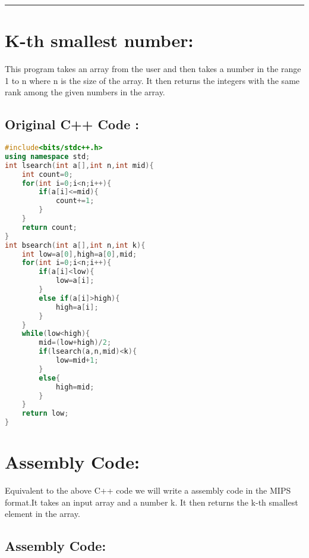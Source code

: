 \documentclass[a4paper,10pt]{article} %
\begin{document}
\rule{\textwidth}{0.5pt}
\section*{\huge{\textbf{K-th smallest number:}}}

This program takes an array from the user and then takes a number in the range 1 to n where n is the size of the array. It then returns the integers with the same rank among the given numbers in the array.

\subsection*{\Large{Original C++ Code :}}


\begin{codebox}
    
\begin{lstlisting}[language=C++]
#include<bits/stdc++.h>
using namespace std;
int lsearch(int a[],int n,int mid){
	int count=0;
	for(int i=0;i<n;i++){
		if(a[i]<=mid){
			count+=1;
		}
	}
	return count;
}
int bsearch(int a[],int n,int k){
	int low=a[0],high=a[0],mid;
	for(int i=0;i<n;i++){
		if(a[i]<low){
			low=a[i];
		}
		else if(a[i]>high){
			high=a[i];
		}
	}
	while(low<high){
		mid=(low+high)/2;
		if(lsearch(a,n,mid)<k){
			low=mid+1;
		}
		else{
			high=mid;
		}
	}
	return low;
}
\end{lstlisting} 
\end{codebox}

\section*{\huge{\textbf{Assembly Code:}}}

Equivalent to the above C++ code we will write a assembly code in the MIPS format.It takes an input array and a number k. It then returns the k-th smallest element in the array.

\subsection*{\large{\textbf{Assembly Code:}}}
\end{document}
